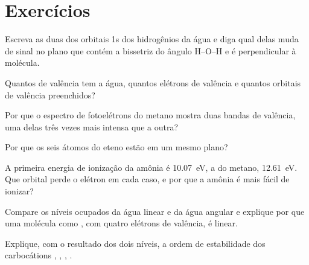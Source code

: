 \section{Exercícios}

\begin{exercise}[$\star$]\label{exo:b2:fragment-orbitals:1}
Escreva as duas  dos orbitais 1s dos
hidrogênios da água e diga qual delas muda de sinal no plano que contém a
bissetriz do ângulo H--O--H e é perpendicular à molécula.
\end{exercise}

\begin{exercise}[$\star$]\label{exo:b2:fragment-orbitals:2}
Quantos  de valência tem a água, quantos elétrons de
valência e quantos orbitais de valência preenchidos?
\end{exercise}

\begin{exercise}[$\star$]\label{exo:b2:fragment-orbitals:3}
Por que o espectro de fotoelétrons do metano mostra duas bandas de valência,
uma delas três vezes mais intensa que a outra?
\end{exercise}

\begin{exercise}[$\star$]\label{exo:b2:fragment-orbitals:4}
Por que os seis átomos do eteno estão em um mesmo plano?
\end{exercise}

\begin{exercise}[$\star\star$]\label{exo:b2:fragment-orbitals:5}
A primeira energia de ionização da amônia é \qty{10.07}{eV}, a do metano,
\qty{12.61}{eV}. Que orbital perde o elétron em cada caso, e por que a amônia é
mais fácil de ionizar?
\end{exercise}

\begin{exercise}[$\star\star$]\label{exo:b2:fragment-orbitals:6}
Compare os níveis ocupados da água linear e da água angular e explique por que
uma molécula como , com quatro elétrons de valência, é linear.
\end{exercise}

\begin{exercise}[$\star\star$]\label{exo:b2:fragment-orbitals:7}
Explique, com o resultado dos dois níveis, a ordem de estabilidade dos
carbocátions , , , .
\end{exercise}

